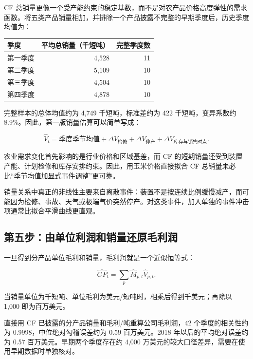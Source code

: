 \documentclass[11pt,a4paper]{ctexart}
\begin{document}
CF 总销量更像一个受产能约束的稳定基数，而不是对农产品价格高度弹性的需求函数。将五类产品销量相加，并排除一个产品披露不完整的早期季度后，历史季度均值为：

\begin{center}
\begin{tabular}{l r r}
\toprule
季度 & 平均总销量（千短吨） & 完整季度数 \\
\midrule
第一季度 & 4,528 & 11 \\
第二季度 & 5,109 & 10 \\
第三季度 & 4,504 & 10 \\
第四季度 & 4,878 & 10 \\
\bottomrule
\end{tabular}
\end{center}

完整样本的总体均值约为 4,749 千短吨，标准差约为 422 千短吨，变异系数约 8.9\%。因此，第一版销量估算可以简单写成：

\begin{equation*}
\widehat{V}_t
=\text{季度季节均值}
+\Delta V_{\text{检修}}
+\Delta V_{\text{停产}}
+\Delta V_{\text{库存与销售时点}}.
\end{equation*}

农业需求变化首先影响的是行业价格和区域基差，而 CF 的短期销量还受到装置产能、计划检修和库存安排约束。因此，用玉米价格直接拟合 CF 总销量未必比“季节均值加显式事件调整”更可靠。

销量关系中真正的非线性主要来自离散事件：装置不是按连续比例缓慢减产，而可能因为检修、事故、天气或极端气价突然停产。对这类事件，加入单独的事件冲击项通常比拟合平滑曲线更直观。

\subsection{第五步：由单位利润和销量还原毛利润}

一旦得到分产品单位毛利和销量，毛利润就是一个近似恒等式：

\begin{equation*}
\widehat{GP}_t
=\sum_p \widehat{M}_{p,t}\widehat{V}_{p,t}.
\end{equation*}

当销量单位为千短吨、单位毛利为美元/短吨时，相乘后得到千美元；再除以 1,000 即为百万美元。

直接用 CF 已披露的分产品销量和毛利/吨重算公司毛利润，42 个季度的相关性约为 0.9998，中位绝对勾稽误差约为 0.59 百万美元。2018 年以后的平均绝对误差约为 0.57 百万美元。早期两个季度存在约 4,000 万美元的较大口径差异，需要在使用早期数据时单独核对。
\end{document}
